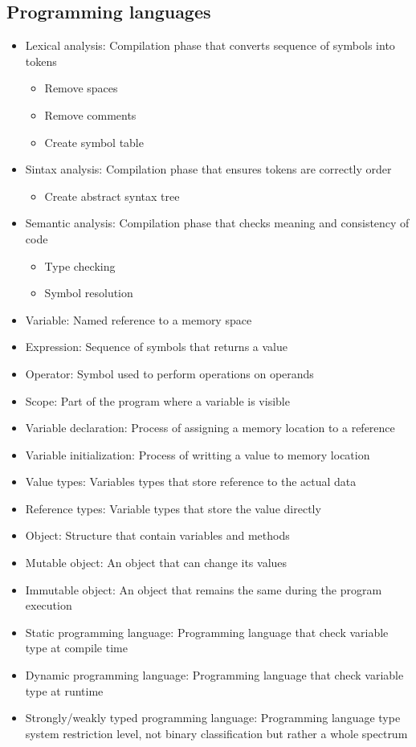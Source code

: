 \documentclass[../../main.tex]{subfiles}
\begin{document}
\subsection{Programming languages}
\begin{itemize}
    \item Lexical analysis: Compilation phase that converts sequence of symbols into tokens
    \begin{itemize}
        \item Remove spaces
        \item Remove comments
        \item Create symbol table
    \end{itemize}
    \item Sintax analysis: Compilation phase that ensures tokens are correctly order
    \begin{itemize}
        \item Create abstract syntax tree
    \end{itemize}
    \item Semantic analysis: Compilation phase that checks meaning and consistency of code
    \begin{itemize}
        \item Type checking
        \item Symbol resolution
    \end{itemize}
    \item Variable: Named reference to a memory space
    \item Expression: Sequence of symbols that returns a value
    \item Operator: Symbol used to perform operations on operands
    \item Scope: Part of the program where a variable is visible
    \item Variable declaration: Process of assigning a memory location to a reference
    \item Variable initialization: Process of writting a value to memory location
    \item Value types: Variables types that store reference to the actual data
    \item Reference types: Variable types that store the value directly
    \item Object: Structure that contain variables and methods
    \item Mutable object: An object that can change its values
    \item Immutable object: An object that remains the same during the program execution
    \item Static programming language: Programming language that check variable type at compile time
    \item Dynamic programming language: Programming language that check variable type at runtime
    \item Strongly/weakly typed programming language: Programming language type system
    restriction level, not binary classification but rather a whole spectrum
\end{itemize}
\end{document}
